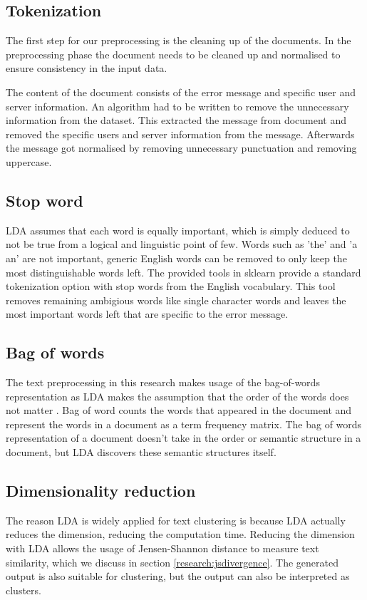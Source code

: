 \subsection{Tokenization}\label{tokenization}
The first step for our preprocessing is the cleaning up of the documents. 
In the preprocessing phase the document needs to be cleaned up and normalised to ensure consistency in the input data.

The content of the document consists of the error message and specific user and server information. An algorithm had to be written to remove the unnecessary information from the dataset. This extracted the message from document and removed the specific users and server information from the message. Afterwards the message got normalised by removing unnecessary punctuation and removing uppercase.

\subsection{Stop word}\label{stop_words}
LDA assumes that each word is equally important, which is simply deduced to not be true from a logical and linguistic point of few. Words such as 'the' and 'a\\an' are not important, generic English words can be removed to only keep the most distinguishable words left. The provided tools in sklearn provide a standard tokenization option with stop words from the English vocabulary. This tool removes remaining ambigious words like single character words and leaves the most important words left that are specific to the error message.

\subsection{Bag of words} \label{bagow}
The text preprocessing in this research makes usage of the bag-of-words representation as LDA makes the assumption that the order of the words does not matter \cite{Blei2010}. Bag of word counts the words that appeared in the document and represent the words in a document as a term frequency matrix. The bag of words representation of a document doesn't take in the order or semantic structure in a document, but LDA discovers these semantic structures itself. 

\subsection{Dimensionality reduction}
The reason LDA is widely applied for text clustering is because LDA actually reduces the dimension, reducing the computation time. Reducing the dimension with LDA allows the usage of Jensen-Shannon distance to measure text similarity, which we discuss in section \ref{research:jsdivergence}. The generated output is also suitable for clustering, but the output can also be interpreted as clusters.

